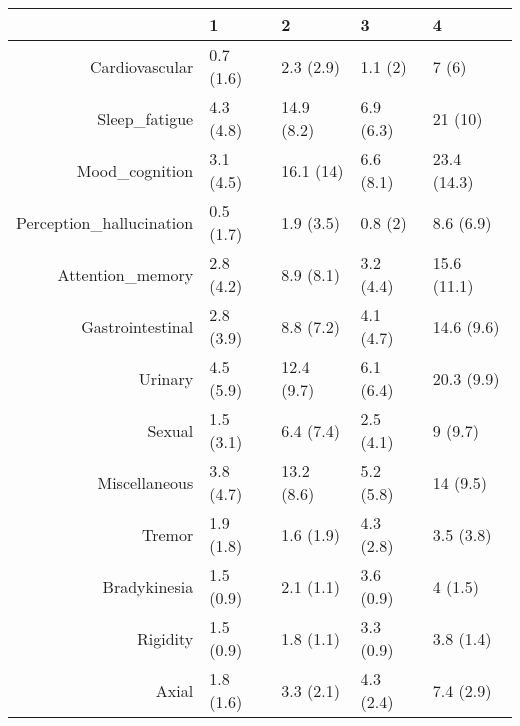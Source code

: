 \begin{table}[ht]
\centering
\begin{tabular}{rllll}
  \toprule
 & 1 & 2 & 3 & 4 \\ 
  \midrule
Cardiovascular & 0.7 (1.6) & 2.3 (2.9) & 1.1 (2) & 7 (6) \\ 
  Sleep\_fatigue & 4.3 (4.8) & 14.9 (8.2) & 6.9 (6.3) & 21 (10) \\ 
  Mood\_cognition & 3.1 (4.5) & 16.1 (14) & 6.6 (8.1) & 23.4 (14.3) \\ 
  Perception\_hallucination & 0.5 (1.7) & 1.9 (3.5) & 0.8 (2) & 8.6 (6.9) \\ 
  Attention\_memory & 2.8 (4.2) & 8.9 (8.1) & 3.2 (4.4) & 15.6 (11.1) \\ 
  Gastrointestinal & 2.8 (3.9) & 8.8 (7.2) & 4.1 (4.7) & 14.6 (9.6) \\ 
  Urinary & 4.5 (5.9) & 12.4 (9.7) & 6.1 (6.4) & 20.3 (9.9) \\ 
  Sexual & 1.5 (3.1) & 6.4 (7.4) & 2.5 (4.1) & 9 (9.7) \\ 
  Miscellaneous & 3.8 (4.7) & 13.2 (8.6) & 5.2 (5.8) & 14 (9.5) \\ 
  Tremor & 1.9 (1.8) & 1.6 (1.9) & 4.3 (2.8) & 3.5 (3.8) \\ 
  Bradykinesia & 1.5 (0.9) & 2.1 (1.1) & 3.6 (0.9) & 4 (1.5) \\ 
  Rigidity & 1.5 (0.9) & 1.8 (1.1) & 3.3 (0.9) & 3.8 (1.4) \\ 
  Axial & 1.8 (1.6) & 3.3 (2.1) & 4.3 (2.4) & 7.4 (2.9) \\ 
   \bottomrule
\end{tabular}
\end{table}

